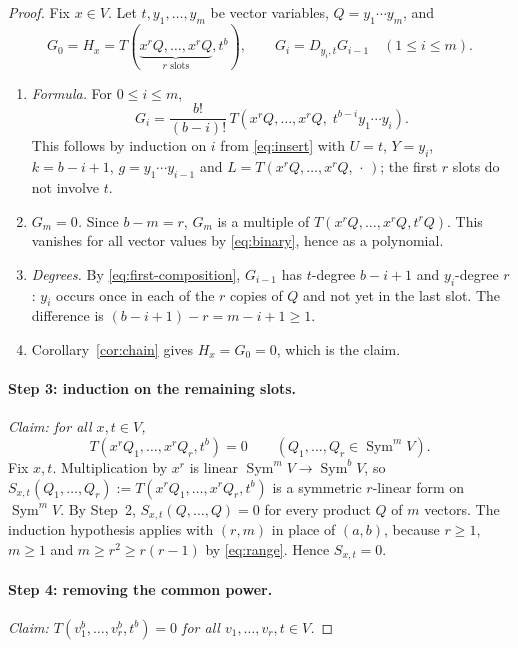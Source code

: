 \documentclass[11pt]{article}
\theoremstyle{remark}
\DeclareMathOperator{\Sym}{Sym}
\newcommand{\D}[2]{D_{#1,#2}}
\begin{document}
\begin{proof}
Fix $x\in V$. Let $t,y_1,\ldots,y_m$ be vector variables, $Q=y_1\cdots y_m$,
and
\[
 G_0=H_x=T(\underbrace{x^rQ,\ldots,x^rQ}_{r\text{ slots}},t^b),
 \qquad G_i=\D{y_i}{t}G_{i-1}\quad(1\le i\le m).
\]
\begin{enumerate}[label=(\alph*),nosep]
\item \emph{Formula.} For $0\le i\le m$,
\begin{equation}\label{eq:first-composition}
 G_i=\frac{b!}{(b-i)!}\,
 T(x^rQ,\ldots,x^rQ,\;t^{b-i}y_1\cdots y_i).
\end{equation}
This follows by induction on $i$ from \eqref{eq:insert} with $U=t$, $Y=y_i$,
$k=b-i+1$, $g=y_1\cdots y_{i-1}$ and $L=T(x^rQ,\ldots,x^rQ,\,\cdot\,)$; the
first $r$ slots do not involve $t$.
\item \emph{$G_m=0$.} Since $b-m=r$, $G_m$ is a multiple of
$T(x^rQ,\ldots,x^rQ,t^rQ)$. This vanishes for all vector values by
\eqref{eq:binary}, hence as a polynomial.
\item \emph{Degrees.} By \eqref{eq:first-composition}, $G_{i-1}$ has
$t$-degree $b-i+1$ and $y_i$-degree $r$: $y_i$ occurs once in each of the $r$
copies of $Q$ and not yet in the last slot. The difference is
$(b-i+1)-r=m-i+1\ge1$.
\item Corollary~\ref{cor:chain} gives $H_x=G_0=0$, which is the claim.
\end{enumerate}

\paragraph{Step 3: induction on the remaining slots.}
\emph{Claim: for all $x,t\in V$,}
\begin{equation}\label{eq:inductive-vanishing}
 T(x^rQ_1,\ldots,x^rQ_r,t^b)=0
 \qquad(Q_1,\ldots,Q_r\in\Sym^m V).
\end{equation}
Fix $x,t$. Multiplication by $x^r$ is linear $\Sym^mV\to\Sym^bV$, so
$S_{x,t}(Q_1,\ldots,Q_r):=T(x^rQ_1,\ldots,x^rQ_r,t^b)$ is a symmetric
$r$-linear form on $\Sym^mV$. By Step~2, $S_{x,t}(Q,\ldots,Q)=0$ for every
product $Q$ of $m$ vectors. The induction hypothesis applies with $(r,m)$ in
place of $(a,b)$, because $r\ge1$, $m\ge1$ and $m\ge r^2\ge r(r-1)$ by
\eqref{eq:range}. Hence $S_{x,t}=0$.

\paragraph{Step 4: removing the common power.}
\emph{Claim: $T(v_1^b,\ldots,v_r^b,t^b)=0$ for all
$v_1,\ldots,v_r,t\in V$.}


\end{proof}
\end{document}
